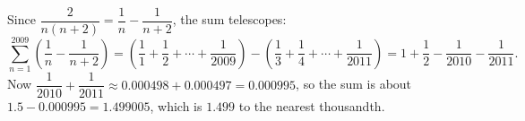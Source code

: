 Since $\dfrac{2}{n(n+2)}=\dfrac{1}{n}-\dfrac{1}{n+2}$, the sum telescopes:
\[\sum_{n=1}^{2009}\left(\dfrac{1}{n}-\dfrac{1}{n+2}\right)=\left(\dfrac{1}{1}+\dfrac{1}{2}+\cdots+\dfrac{1}{2009}\right)-\left(\dfrac{1}{3}+\dfrac{1}{4}+\cdots+\dfrac{1}{2011}\right)=1+\dfrac{1}{2}-\dfrac{1}{2010}-\dfrac{1}{2011}.\]
Now $\dfrac{1}{2010}+\dfrac{1}{2011}\approx0.000498+0.000497=0.000995$, so the sum is about $1.5-0.000995=1.499005$, which is $\boxed{1.499}$ to the nearest thousandth.
